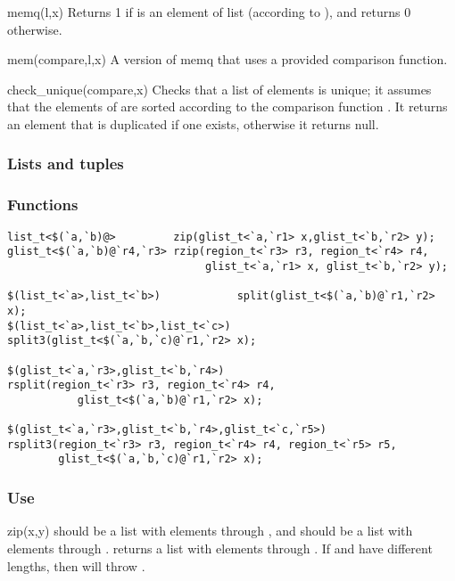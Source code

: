 \begin{defun}{memq}{(l,x)}
Returns 1 if  is an element of list  (according to
\code{==}), and returns 0 otherwise.
\end{defun}

\begin{defun}{mem}{(compare,l,x)}
A version of memq that uses a provided comparison function.
\end{defun}

\begin{defun}{check_unique}{(compare,x)}
Checks that a list of elements is unique; it assumes that the elements
of  are sorted according to the comparison function
.  It returns an element that is duplicated if one exists,
otherwise it returns null.
\end{defun}

\subsubsection*{Lists and tuples}
\subsubsection*{Functions}
\begin{verbatim}
list_t<$(`a,`b)@>         zip(glist_t<`a,`r1> x,glist_t<`b,`r2> y);
glist_t<$(`a,`b)@`r4,`r3> rzip(region_t<`r3> r3, region_t<`r4> r4,
                               glist_t<`a,`r1> x, glist_t<`b,`r2> y);

$(list_t<`a>,list_t<`b>)            split(glist_t<$(`a,`b)@`r1,`r2> x);
$(list_t<`a>,list_t<`b>,list_t<`c>) split3(glist_t<$(`a,`b,`c)@`r1,`r2> x);

$(glist_t<`a,`r3>,glist_t<`b,`r4>) 
rsplit(region_t<`r3> r3, region_t<`r4> r4,
           glist_t<$(`a,`b)@`r1,`r2> x);

$(glist_t<`a,`r3>,glist_t<`b,`r4>,glist_t<`c,`r5>) 
rsplit3(region_t<`r3> r3, region_t<`r4> r4, region_t<`r5> r5,
        glist_t<$(`a,`b,`c)@`r1,`r2> x);
\end{verbatim}
  
\subsubsection*{Use}

\begin{defun}{zip}{(x,y)}
 should be a list with elements  through , and
 should be a list with elements  through .
 returns a list with elements 
through .  If  and  have
different lengths, then  will throw
.
\end{defun}

